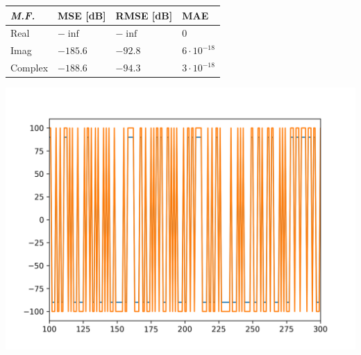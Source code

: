 \documentclass[11pt]{scrartcl} %
\begin{document}
\begin{preview}
\begin{minipage}{\linewidth}
	\begin{center}
	\centering %
		\begin{tabular}{l l l l}
		\toprule
		\textit{M.F.} & \textbf{MSE [dB]} & \textbf{RMSE [dB]} & \textbf{MAE}\\
		\midrule
		Real & $-\inf$ &  $-\inf$ & $ 0 $ \\
		Imag & $-185.6$ &  $-92.8$ & $6 \cdot 10^{-18}$ \\
		Complex & $-188.6$ &  $-94.3$ & $3 \cdot 10^{-18}$ \\
		\bottomrule
	\end{tabular}
	\end{center}
\end{minipage}

\begin{minipage}{\linewidth}
	\begin{center}
		\includegraphics[width=1\columnwidth,trim={0 0.5cm 1cm 1cm},clip]{../../Linux/Trabajo/FullSystemCCTb/imgs/eq.png} %
	\end{center}
	\label{eqrandomflat}
\end{minipage}


\end{preview}
\end{document}
